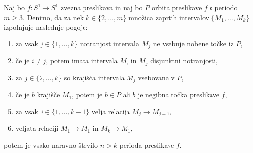 \documentclass[../TG_magistrsko_delo_sections.tex]{subfiles}
\begin{document}
\begin{lema}\label{lem:7}		%
Naj bo $f \colon S^1 \to S^1$ zvezna preslikava in naj bo $P$ orbita preslikave $f$ s periodo $m \geq 3$. Denimo, da za nek $k \in \{2, \dots, m\}$ množica zaprtih intervalov $\{M_1, \dots, M_k\}$ izpolnjuje naslednje pogoje:
\begin{enumerate}
\item za vsak $j \in \{1, \dots, k\}$ notranjost intervala $M_j$ ne vsebuje nobene točke iz $P$,\label{enum:p1}
\item če je $i \neq j$, potem imata intervala $M_i$ in $M_j$ disjunktni notranjosti,\label{enum:p2}
\item za $j \in \{2, \dots, k\}$ so krajišča intervala $M_j$ vsebovana v $P$,\label{enum:p3}
\item če je $b$ krajišče $M_1$, potem je $b \in P$ ali $b$ je negibna točka preslikave $f$,\label{enum:p4}
\item za vsak $j \in \{1, \dots, k-1 \}$ velja relacija $M_j \to M_{j+1}$,\label{enum:p5}
\item veljata relaciji $M_1 \to M_1$ in $M_k \to M_1$,\label{enum:p6}
\end{enumerate}
potem je vsako naravno število $n > k$ perioda preslikave $f$.
\end{lema}
\end{document}
